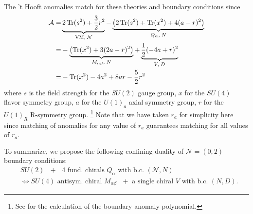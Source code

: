 \documentclass[12pt]{article}
\newcommand{\Acal}{\mathcal{A}}
\newcommand{\Ncal}{\mathcal{N}}
\DeclareMathOperator*{\Tr}{{\rm Tr}}
\numberwithin{equation}{section}
\begin{document}
The 't Hooft anomalies match for these theories and boundary conditions since
\begin{align}
\label{bdy_AN_su2_2}
\Acal = & \underbrace{2\Tr(s^2) + \frac{3}{2}r^2}_{\textrm{VM}, \; \Ncal}
 - \underbrace{\left( 2\Tr(s^2) + \Tr(x^2) + 4(a-r)^2 \right)}_{Q_{\alpha}, \; N}
  \nonumber \\
  = & - \underbrace{\left( \Tr(x^2) + 3(2a-r)^2 \right)}_{M_{\alpha \beta}, \; N}
   + \underbrace{\frac{1}{2}(-4a+r)^2}_{V, \; D}
  \nonumber \\
  = & - \Tr(x^2) - 4a^2 + 8ar - \frac{5}{2}r^2
\end{align}
where $s$ is the field strength for the $SU(2)$ gauge group, 
$x$ for the $SU(4)$ flavor symmetry group, 
$a$ for the $U(1)_a$ axial symmetry group, 
$r$ for the $U(1)_R$ R-symmetry group. \footnote{
See \cite{Dimofte:2017tpi} for the calculation of the boundary anomaly polynomial. 
}
Note that we have taken $r_a$ for simplicity here since matching of anomalies for any value of $r_a$ guarantees matching for all values of $r_a$.

To summarize, we propose the following confining duality of $\mathcal{N}=(0,2)$ boundary conditions: 
\begin{align}
\label{bcdual_su2nf2na2}
&\textrm{$SU(2)$ $+$ $4$ fund. chirals $Q_{\alpha}$ with b.c. $(\mathcal{N},N)$}
\nonumber\\
&\Leftrightarrow 
\textrm{
$SU(4)$ antisym. chiral $M_{\alpha \beta}$ $+$ a single chiral $V$ with b.c. $(N,D)$}. 
\end{align}
\end{document}
